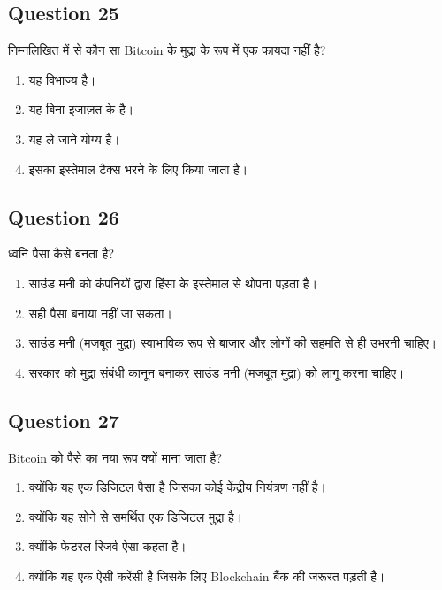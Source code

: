 \documentclass[12pt,a4paper]{article}
\begin{document}
\bigskip


\subsection*{Question 25}
निम्नलिखित में से कौन सा Bitcoin के मुद्रा के रूप में एक फायदा नहीं है?

\begin{enumerate}[label=\Alph*., leftmargin=*]
\item यह विभाज्य है।
\item यह बिना इजाज़त के है।
\item यह ले जाने योग्य है।
\item इसका इस्तेमाल टैक्स भरने के लिए किया जाता है।
\end{enumerate}

\bigskip


\subsection*{Question 26}
ध्वनि पैसा कैसे बनता है?

\begin{enumerate}[label=\Alph*., leftmargin=*]
\item साउंड मनी को कंपनियों द्वारा हिंसा के इस्तेमाल से थोपना पड़ता है।
\item सही पैसा बनाया नहीं जा सकता।
\item साउंड मनी (मजबूत मुद्रा) स्वाभाविक रूप से बाजार और लोगों की सहमति से ही उभरनी चाहिए।
\item सरकार को मुद्रा संबंधी कानून बनाकर साउंड मनी (मजबूत मुद्रा) को लागू करना चाहिए।
\end{enumerate}

\bigskip


\subsection*{Question 27}
Bitcoin को पैसे का नया रूप क्यों माना जाता है?

\begin{enumerate}[label=\Alph*., leftmargin=*]
\item क्योंकि यह एक डिजिटल पैसा है जिसका कोई केंद्रीय नियंत्रण नहीं है।
\item क्योंकि यह सोने से समर्थित एक डिजिटल मुद्रा है।
\item क्योंकि फेडरल रिजर्व ऐसा कहता है।
\item क्योंकि यह एक ऐसी करेंसी है जिसके लिए Blockchain बैंक की जरूरत पड़ती है।
\end{enumerate}
\end{document}
